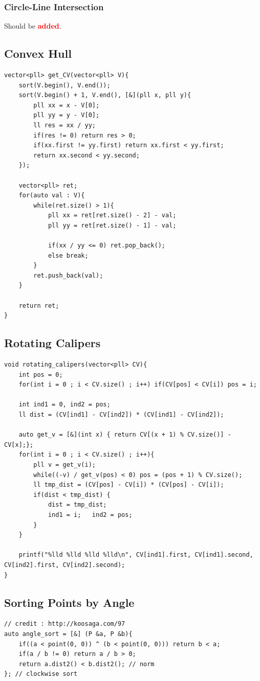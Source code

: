 \documentclass[landscape, 8pt, a4paper, oneside, twocolumn]{extarticle}
\newcommand{\added}{Should be \textcolor{red}{\textbf{added}}.}
\begin{document}
\subsubsection{Circle-Line Intersection}
\added
\subsection{Convex Hull}
\begin{verbatim}
vector<pll> get_CV(vector<pll> V){
    sort(V.begin(), V.end());
    sort(V.begin() + 1, V.end(), [&](pll x, pll y){
        pll xx = x - V[0];
        pll yy = y - V[0];
        ll res = xx / yy;
        if(res != 0) return res > 0;
        if(xx.first != yy.first) return xx.first < yy.first;
        return xx.second < yy.second;
    });

    vector<pll> ret;
    for(auto val : V){
        while(ret.size() > 1){
            pll xx = ret[ret.size() - 2] - val;
            pll yy = ret[ret.size() - 1] - val;

            if(xx / yy <= 0) ret.pop_back();
            else break;
        }
        ret.push_back(val);
    }

    return ret;
}
\end{verbatim}
\subsection{Rotating Calipers}
\begin{verbatim}
void rotating_calipers(vector<pll> CV){
    int pos = 0;
    for(int i = 0 ; i < CV.size() ; i++) if(CV[pos] < CV[i]) pos = i;

    int ind1 = 0, ind2 = pos;
    ll dist = (CV[ind1] - CV[ind2]) * (CV[ind1] - CV[ind2]);

    auto get_v = [&](int x) { return CV[(x + 1) % CV.size()] - CV[x];};
    for(int i = 0 ; i < CV.size() ; i++){
        pll v = get_v(i);
        while((-v) / get_v(pos) < 0) pos = (pos + 1) % CV.size();
        ll tmp_dist = (CV[pos] - CV[i]) * (CV[pos] - CV[i]);
        if(dist < tmp_dist) {
            dist = tmp_dist;
            ind1 = i;   ind2 = pos;
        }
    }

    printf("%lld %lld %lld %lld\n", CV[ind1].first, CV[ind1].second, CV[ind2].first, CV[ind2].second);
}
\end{verbatim}
\subsection{Sorting Points by Angle}
\begin{verbatim}
// credit : http://koosaga.com/97
auto angle_sort = [&] (P &a, P &b){
    if((a < point(0, 0)) ^ (b < point(0, 0))) return b < a;
    if(a / b != 0) return a / b > 0;
    return a.dist2() < b.dist2(); // norm
}; // clockwise sort
\end{verbatim}
\end{document}
